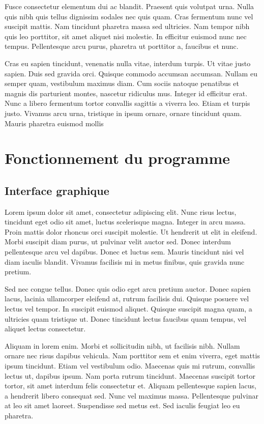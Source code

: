 \documentclass{report}
\begin{document}
            Fusce consectetur elementum dui ac blandit. Praesent quis volutpat urna. Nulla quis nibh quis tellus dignissim sodales nec quis quam. Cras fermentum nunc vel suscipit mattis. Nam tincidunt pharetra massa sed ultricies. Nam tempor nibh quis leo porttitor, sit amet aliquet nisi molestie. In efficitur euismod nunc nec tempus. Pellentesque arcu purus, pharetra ut porttitor a, faucibus et nunc.

            Cras eu sapien tincidunt, venenatis nulla vitae, interdum turpis. Ut vitae justo sapien. Duis sed gravida orci. Quisque commodo accumsan accumsan. Nullam eu semper quam, vestibulum maximus diam. Cum sociis natoque penatibus et magnis dis parturient montes, nascetur ridiculus mus. Integer id efficitur erat. Nunc a libero fermentum tortor convallis sagittis a viverra leo. Etiam et turpis justo. Vivamus arcu urna, tristique in ipsum ornare, ornare tincidunt quam. Mauris pharetra euismod mollis


    \chapter{Fonctionnement du programme}
        \section{Interface graphique}
            Lorem ipsum dolor sit amet, consectetur adipiscing elit. Nunc risus lectus, tincidunt eget odio sit amet, luctus scelerisque magna. Integer in arcu massa. Proin mattis dolor rhoncus orci suscipit molestie. Ut hendrerit ut elit in eleifend. Morbi suscipit diam purus, ut pulvinar velit auctor sed. Donec interdum pellentesque arcu vel dapibus. Donec et luctus sem. Mauris tincidunt nisi vel diam iaculis blandit. Vivamus facilisis mi in metus finibus, quis gravida nunc pretium.

            Sed nec congue tellus. Donec quis odio eget arcu pretium auctor. Donec sapien lacus, lacinia ullamcorper eleifend at, rutrum facilisis dui. Quisque posuere vel lectus vel tempor. In suscipit euismod aliquet. Quisque suscipit magna quam, a ultricies quam tristique ut. Donec tincidunt lectus faucibus quam tempus, vel aliquet lectus consectetur.

            Aliquam in lorem enim. Morbi et sollicitudin nibh, ut facilisis nibh. Nullam ornare nec risus dapibus vehicula. Nam porttitor sem et enim viverra, eget mattis ipsum tincidunt. Etiam vel vestibulum odio. Maecenas quis mi rutrum, convallis lectus ut, dapibus ipsum. Nam porta rutrum tincidunt. Maecenas suscipit tortor tortor, sit amet interdum felis consectetur et. Aliquam pellentesque sapien lacus, a hendrerit libero consequat sed. Nunc vel maximus massa. Pellentesque pulvinar at leo sit amet laoreet. Suspendisse sed metus est. Sed iaculis feugiat leo eu pharetra.
\end{document}
